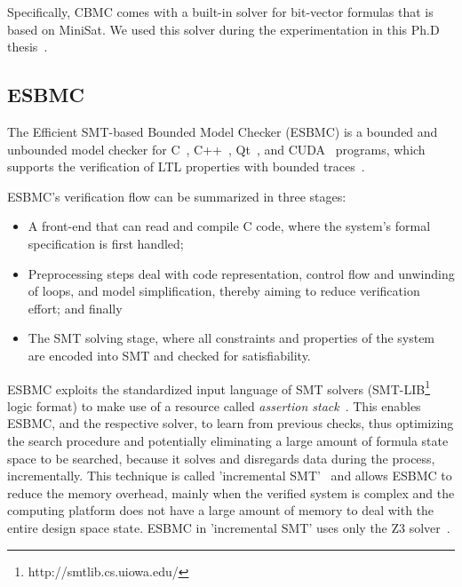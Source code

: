 Specifically, CBMC comes with a built-in solver for bit-vector formulas that is based on MiniSat. We used this solver during the experimentation in this Ph.D thesis~\cite{Kroening}.

\subsection{ESBMC}
\label{sec:ESBMC}

The Efficient SMT-based Bounded Model Checker (ESBMC) is a bounded and unbounded model checker for C~\cite{esbmc2018,GadelhaMCN19}, C++~\cite{RamalhoFSMC013}, Qt~\cite{MonteiroGCF17}, and CUDA~\cite{PereiraASMMFC17} programs, which supports the verification of LTL properties with bounded traces~\cite{DBLP:journals/sosym/MorseCN015}. 

ESBMC's verification flow can be summarized in three stages: 

\begin{itemize}
\item A front-end that can read and compile C code, where the system's formal specification is first handled; 
\item Preprocessing steps deal with code representation, control flow and unwinding of loops, and model simplification, thereby aiming to reduce verification effort; and finally 
\item The SMT solving stage, where all constraints and properties of the system are encoded into SMT and checked for satisfiability.
\end{itemize}
 
ESBMC exploits the standardized input language of SMT solvers (SMT-LIB\footnote{http://smtlib.cs.uiowa.edu/} logic format) to make use of a resource called \textit{assertion stack}~\cite{Morse2015}. This enables ESBMC, and the respective solver, to learn from previous checks, thus optimizing the search procedure and potentially eliminating a large amount of formula state space to be searched, because it solves and disregards data during the process, incrementally. This technique is called 'incremental SMT'~\cite{DBLP:journals/fac/SchrammelKBMTB17} and allows ESBMC to reduce the memory overhead, mainly when the verified system is complex and the computing platform does not have a large amount of memory to deal with the entire design space state. ESBMC in 'incremental SMT' uses only the Z3 solver~\cite{DeMoura}.

